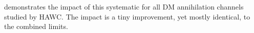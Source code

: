  demonstrates the impact of this systematic for all DM annihilation channels studied by HAWC. The impact is a tiny improvement, yet mostly identical, to the combined limits.

\begin{figure}[h]
\end{figure}
